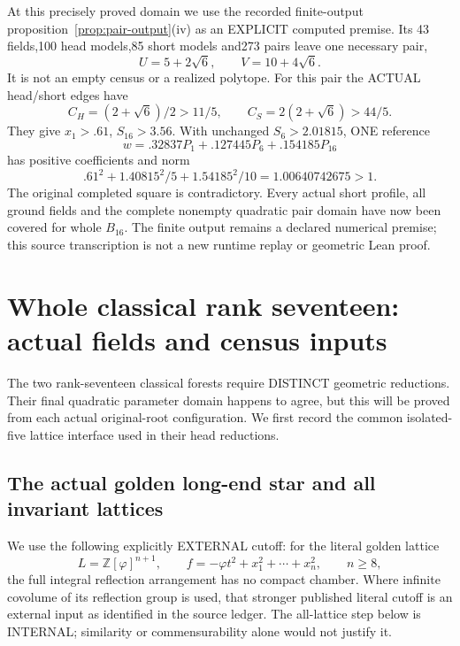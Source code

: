 At this precisely proved domain we use the recorded
finite-output proposition~\ref{prop:pair-output}(iv)
as an EXPLICIT computed premise.
Its 43 fields,100 head models,85 short models
and273 pairs leave one necessary pair,
\[
                  U=5+2\sqrt6,\qquad V=10+4\sqrt6 .
\]
It is not an empty census or a realized polytope.
For this pair the ACTUAL head/short edges have
\[
 C_H=(2+\sqrt6)/2>11/5,\qquad
 C_S=2(2+\sqrt6)>44/5.
\]
They give \(x_1>.61\), \(S_{16}>3.56\).
With unchanged \(S_6>2.01815\), ONE reference
\[
                  w=.32837P_1+.127445P_6+.154185P_{16}
\]
has positive coefficients and norm
\[
                  .61^2+1.40815^2/5+1.54185^2/10
                              =1.00640742675>1 .
\]
The original completed square is contradictory.
Every actual short profile, all ground fields and
the complete nonempty quadratic pair domain have
now been covered for whole \(B_{16}\).
The finite output remains a declared numerical
premise; this source transcription is not a
new runtime replay or geometric Lean proof.

\section{Whole classical rank seventeen: actual fields and census inputs}
\label{app:arithBD17actual}

The two rank-seventeen classical forests require
DISTINCT geometric reductions.
Their final quadratic parameter domain happens
to agree, but this will be proved from each
actual original-root configuration.
We first record the common isolated-five lattice
interface used in their head reductions.

\subsection{The actual golden long-end star and all invariant lattices}
\label{app:arithgoldenlongstar}

We use the following explicitly EXTERNAL cutoff:
for the literal golden lattice
\[
 L=\mathbb Z[\varphi]^{n+1},\qquad
 f=-\varphi t^2+x_1^2+\cdots+x_n^2,\qquad n\ge8,
\]
the full integral reflection arrangement has no
compact chamber.
Where infinite covolume of its reflection group
is used, that stronger published literal cutoff
is an external input as identified in the source ledger.
The all-lattice step below is INTERNAL; similarity
or commensurability alone would not justify it.

